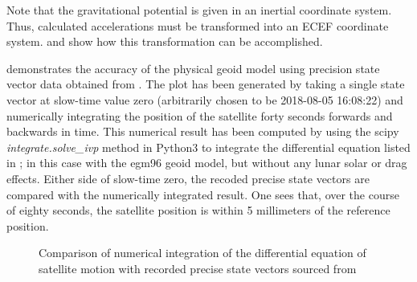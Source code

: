 Note that the gravitational potential is given in an inertial coordinate system. Thus, calculated accelerations must be transformed into an ECEF coordinate system.  and \cite{Shou2014} show how this transformation can be accomplished. 
\par
{} demonstrates the accuracy of the physical geoid model using precision state vector data obtained from \cite{SentinelPOD}. The plot has been generated by taking a single state vector at slow-time value zero (arbitrarily chosen to be 2018-08-05 16:08:22) and numerically integrating the position of the satellite forty seconds forwards and backwards in time. This numerical result has been computed by using the scipy {\em integrate.solve\_ivp} method in Python3 to integrate the differential equation listed in \cite{Shou2014}; in this case with the egm96 geoid model, but without any lunar solar or drag effects. Either side of slow-time zero, the recoded precise state vectors are compared with the numerically integrated result. One sees that, over the course of eighty seconds, the satellite position is within 5 millimeters of the reference position.
\begin{figure}
    \resizebox{\textwidth}{!}{}
	\caption{Comparison of numerical integration of the differential equation of satellite motion with recorded precise state vectors sourced from \cite{SentinelPOD}}
	\label{fg:GeoidPreciseState}
\end{figure}
